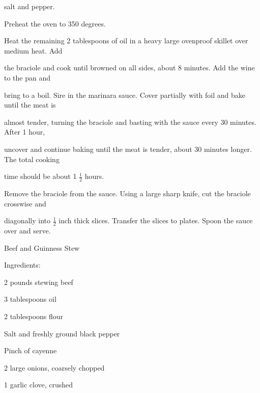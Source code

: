\documentclass[a4paper,portrait,12pt]{book}
\begin{document}
salt and pepper.




Preheat the oven to 350 degrees.




Heat the remaining 2 tablespoons of oil in a heavy large ovenproof skillet over medium heat. Add




the braciole and cook until browned on all sides, about 8 minutes. Add the wine to the pan and




bring to a boil. Sire in the marinara sauce. Cover partially with foil and bake until the meat is




almost tender, turning the braciole and basting with the sauce every 30 minutes. After 1 hour,




uncover and continue baking until the meat is tender, about 30 minutes longer. The total cooking




time should be about 1 $\frac{1}{2}$ hours.




Remove the braciole from the sauce. Using a large sharp knife, cut the braciole crosswise and




diagonally into $\frac{1}{2}$ inch thick slices. Transfer the slices to plates. Spoon the sauce over and serve.







\newpage
Beef and Guinness Stew




Ingredients:




2 pounds stewing beef




3 tablespoons oil




2 tablespoons flour




Salt and freshly ground black pepper




Pinch of cayenne




2 large onions, coarsely chopped




1 garlic clove, crushed
\end{document}
